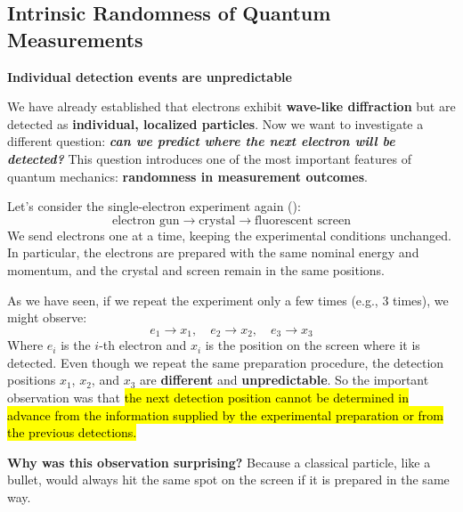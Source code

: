 \subsection{Intrinsic Randomness of Quantum Measurements}\label{sec:from-wave-particle-duality-to-quantum-states:intrinsic-randomness-of-quantum-measurements}

\begin{flushleft}
    \textcolor{Green3}{ \textbf{Individual detection events are unpredictable}}
\end{flushleft}
We have already established that electrons exhibit \textbf{wave-like diffraction} but are detected as \textbf{individual, localized particles}. Now we want to investigate a different question: \textbf{\emph{can we predict where the next electron will be detected?}} This question introduces one of the most important features of quantum mechanics: \textbf{randomness in measurement outcomes}.

\highspace
Let's consider the single-electron experiment again ():
\begin{equation*}
    \text{electron gun}
    \rightarrow
    \text{crystal}
    \rightarrow
    \text{fluorescent screen}
\end{equation*}
We send electrons one at a time, keeping the experimental conditions unchanged. In particular, the electrons are prepared with the same nominal energy and momentum, and the crystal and screen remain in the same positions.

\highspace
As we have seen, if we repeat the experiment only a few times (e.g., 3 times), we might observe:
\begin{equation*}
    e_1 \rightarrow x_1, \quad
    e_2 \rightarrow x_2, \quad
    e_3 \rightarrow x_3
\end{equation*}
Where $e_i$ is the $i$-th electron and $x_i$ is the position on the screen where it is detected. Even though we repeat the same preparation procedure, the detection positions $x_1$, $x_2$, and $x_3$ are \textbf{different} and \textbf{unpredictable}. So the important observation was that \hl{the next detection position cannot be determined in advance from the information supplied by the experimental preparation or from the previous detections.}

\highspace
\textcolor{Green3}{ \textbf{Why was this observation surprising?}} Because a classical particle, like a bullet, would always hit the same spot on the screen if it is prepared in the same way.

